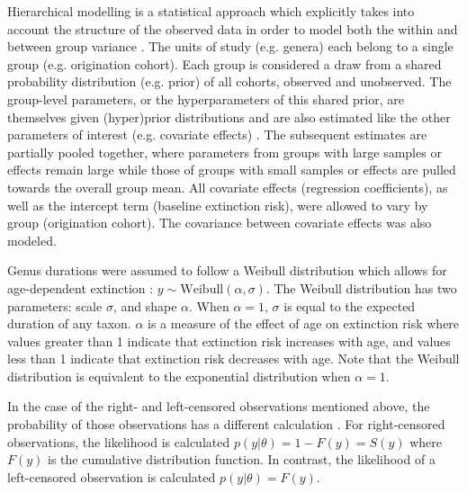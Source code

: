 \documentclass{article}
\begin{document}
Hierarchical modelling is a statistical approach which explicitly takes into account the structure of the observed data in order to model both the within and between group variance \citep{Gelman2013d,Gelman2007}. The units of study (e.g. genera) each belong to a single group (e.g. origination cohort). Each group is considered a draw from a shared probability distribution (e.g. prior) of all cohorts, observed and unobserved. The group-level parameters, or the hyperparameters of this shared prior, are themselves given (hyper)prior distributions and are also estimated like the other parameters of interest (e.g. covariate effects) \citep{Gelman2013d}. The subsequent estimates are partially pooled together, where parameters from groups with large samples or effects remain large while those of groups with small samples or effects are pulled towards the overall group mean. All covariate effects (regression coefficients), as well as the intercept term (baseline extinction risk), were allowed to vary by group (origination cohort). The covariance between covariate effects was also modeled. 

Genus durations were assumed to follow a Weibull distribution which allows for age-dependent extinction \citep{Klein2003}: \(y \sim \mathrm{Weibull}(\alpha, \sigma)\). The Weibull distribution has two parameters: scale \(\sigma\), and shape \(\alpha\). When \(\alpha = 1\), \(\sigma\) is equal to the expected duration of any taxon. \(\alpha\) is a measure of the effect of age on extinction risk where values greater than 1 indicate that extinction risk increases with age, and values less than 1 indicate that extinction risk decreases with age. Note that the Weibull distribution is equivalent to the exponential distribution when \(\alpha = 1\). 

In the case of the right- and left-censored observations mentioned above, the probability of those observations has a different calculation \citep{Klein2003}. For right-censored observations, the likelihood is calculated \(p(y | \theta) = 1 - F(y) = S(y)\) where \(F(y)\) is the cumulative distribution function. In contrast, the likelihood of a left-censored observation is calculated \(p(y | \theta) = F(y)\).
\end{document}
